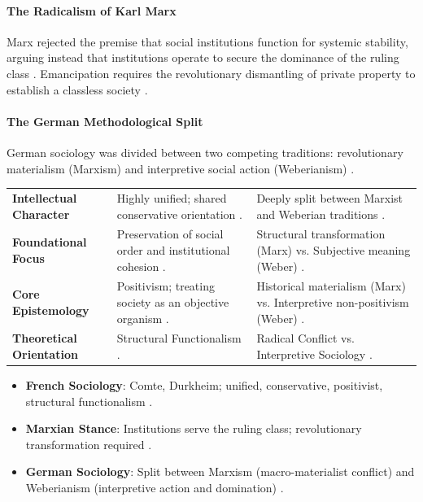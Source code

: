 \paragraph{The Radicalism of Karl Marx}
Marx rejected the premise that social institutions function for systemic stability, arguing instead that institutions operate to secure the dominance of the ruling class . Emancipation requires the revolutionary dismantling of private property to establish a classless society .

\paragraph{The German Methodological Split}
German sociology was divided between two competing traditions: revolutionary materialism (Marxism) and interpretive social action (Weberianism) .

\begin{table}[htbp]
\centering
\begin{tabularx}{\textwidth}{p{3.2cm} Y Y}
\hline
{}
 &  &  \\
\hline
\textbf{Intellectual Character} & Highly unified; shared conservative orientation . & Deeply split between Marxist and Weberian traditions . \\
\textbf{Foundational Focus} & Preservation of social order and institutional cohesion . & Structural transformation (Marx) vs. Subjective meaning (Weber) . \\
\textbf{Core Epistemology} & Positivism; treating society as an objective organism . & Historical materialism (Marx) vs. Interpretive non-positivism (Weber) . \\
\textbf{Theoretical Orientation} & Structural Functionalism . & Radical Conflict vs. Interpretive Sociology . \\
\hline
\end{tabularx}
\end{table}

\begin{QuickRevision}
\begin{itemize}
    \item \textbf{French Sociology}: Comte, Durkheim; unified, conservative, positivist, structural functionalism .
    \item \textbf{Marxian Stance}: Institutions serve the ruling class; revolutionary transformation required .
    \item \textbf{German Sociology}: Split between Marxism (macro-materialist conflict) and Weberianism (interpretive action and domination) .
\end{itemize}
\end{QuickRevision}

